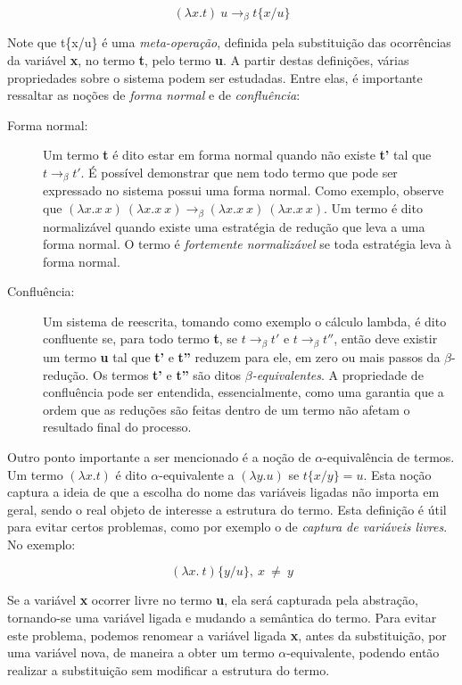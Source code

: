 \[ (\lambda x.t)\ u \rightarrow_{\beta} t\{x/u\} \]

Note que t\{x/u\} é uma \textit{meta-operação}, definida pela substituição das
ocorrências da variável \textbf{x}, no termo \textbf{t}, pelo termo \textbf{u}.
A partir destas definições, várias propriedades sobre o sistema podem ser
estudadas. Entre elas, é importante ressaltar as noções de \textit{forma
 normal} e de \textit{confluência}:

\begin{description}
    \item[Forma normal:] Um termo \textbf{t} é dito estar em forma
    normal quando não existe \textbf{t'} tal que $ t \rightarrow_\beta t' $. 
    É possível demonstrar que nem todo termo que pode ser expressado no sistema
    possui uma forma normal. Como exemplo, observe que $ (\lambda x.x\ x)\ (\lambda
    x.x\ x) \rightarrow_\beta (\lambda x.x\ x)\ (\lambda x.x\ x) $. Um termo é
    dito normalizável quando existe uma estratégia de redução que leva a uma
    forma normal. O termo é \emph{fortemente normalizável} se toda estratégia
    leva à forma normal.

    \item[Confluência:] Um sistema de reescrita, tomando como exemplo o cálculo
    lambda, é dito confluente se, para todo termo \textbf{t}, se $ t
    \rightarrow_\beta t' $ e $ t \rightarrow_\beta t'' $, então deve existir
    um termo \textbf{u} tal que \textbf{t'} e \textbf{t''} reduzem para ele,
    em zero ou mais passos da $\beta$-redução.  Os termos \textbf{t'} e
    \textbf{t''} são ditos \textit{$\beta$-equivalentes}.  A propriedade de
    confluência pode ser entendida, essencialmente, como uma garantia que a
    ordem que as reduções são feitas dentro de um termo não afetam o
    resultado final do processo.

\end{description}

Outro ponto importante a ser mencionado é a noção de $\alpha$-equivalência de
termos. Um termo $(\lambda x. t)$ é dito $\alpha$-equivalente a $(\lambda y. u)$
se $ t\{x/y\} = u $. Esta noção captura a ideia de que a escolha do nome das
variáveis ligadas não importa em geral, sendo o real objeto de interesse a
estrutura do termo. Esta definição é útil para evitar certos problemas, como por
exemplo o de \textit{captura de variáveis livres}. No exemplo:

\[ (\lambda x.\ t)\{y/u\},\ x\ \neq\ y \]

Se a variável \textbf{x} ocorrer livre no termo \textbf{u}, ela será capturada
pela abstração, tornando-se uma variável ligada e mudando a semântica do termo.
Para evitar este problema, podemos renomear a variável ligada \textbf{x}, antes
da substituição, por uma variável nova, de maneira a obter um termo
$\alpha$-equivalente, podendo então realizar a substituição sem modificar a
estrutura do termo.


